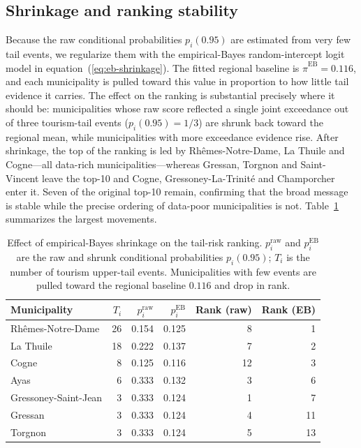 \documentclass[11pt,a4paper]{article}
\begin{document}
\subsection{Shrinkage and ranking stability}

Because the raw conditional probabilities $p_i(0.95)$ are estimated from very few tail events, we regularize them with the empirical-Bayes random-intercept logit model in equation~(\ref{eq:eb-shrinkage}). The fitted regional baseline is $\widehat{\pi}^{\mathrm{EB}} = 0.116$, and each municipality is pulled toward this value in proportion to how little tail evidence it carries. The effect on the ranking is substantial precisely where it should be: municipalities whose raw score reflected a single joint exceedance out of three tourism-tail events ($p_i(0.95)=1/3$) are shrunk back toward the regional mean, while municipalities with more exceedance evidence rise. After shrinkage, the top of the ranking is led by Rh\^emes-Notre-Dame, La Thuile and Cogne---all data-rich municipalities---whereas Gressan, Torgnon and Saint-Vincent leave the top-10 and Cogne, Gressoney-La-Trinit\'e and Champorcher enter it. Seven of the original top-10 remain, confirming that the broad message is stable while the precise ordering of data-poor municipalities is not. Table~\ref{tab:shrinkage} summarizes the largest movements.

\begin{table}[H]
\centering
\small
\caption{Effect of empirical-Bayes shrinkage on the tail-risk ranking. $p_i^{\mathrm{raw}}$ and $p_i^{\mathrm{EB}}$ are the raw and shrunk conditional probabilities $p_i(0.95)$; $T_i$ is the number of tourism upper-tail events. Municipalities with few events are pulled toward the regional baseline $0.116$ and drop in rank.}
\label{tab:shrinkage}
\begin{tabular}{lrrrrr}
\toprule
Municipality & $T_i$ & $p_i^{\mathrm{raw}}$ & $p_i^{\mathrm{EB}}$ & Rank (raw) & Rank (EB) \\
\midrule
Rh\^emes-Notre-Dame & 26 & 0.154 & 0.125 & 8 & 1 \\
La Thuile & 18 & 0.222 & 0.137 & 7 & 2 \\
Cogne & 8 & 0.125 & 0.116 & 12 & 3 \\
Ayas & 6 & 0.333 & 0.132 & 3 & 6 \\
Gressoney-Saint-Jean & 3 & 0.333 & 0.124 & 1 & 7 \\
Gressan & 3 & 0.333 & 0.124 & 4 & 11 \\
Torgnon & 3 & 0.333 & 0.124 & 5 & 13 \\
\bottomrule
\end{tabular}
\end{table}
\end{document}

